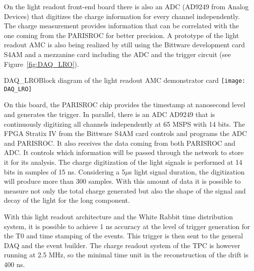 On the light readout front-end board there is also an ADC (AD9249 from Analog Devices) that digitizes the charge information for every channel independently. The charge measurement provides information that can be correlated with the one coming from the PARISROC for better precision. A prototype of the light readout AMC is also being realized by still using the Bittware development card S4AM and a mezzanine card including the ADC and the trigger circuit (see Figure~\ref{fig:DAQ_LRO}). 

\begin{cdrfigure}{DAQ_LRO}{Block diagram of the light readout AMC demonstrator card}
 \texttt{[image: DAQ\_LRO]}  
\end{cdrfigure}

On this board, the PARISROC chip provides the timestamp at nanosecond level and generates the trigger. In parallel, there is an ADC AD9249 that is continuously digitizing all channels independently at 65 MSPS with 14 bits. The FPGA Stratix IV from the Bittware S4AM card controls and programs the ADC and PARISROC. It also receives the data coming from both PARISROC and ADC. It controls which information will be passed through the network to store it for its analysis.  The charge digitization of the light signals is performed at 14 bits in samples of 15 ns. Considering a 5$\mu$s light signal duration, the digitization will produce more than 300 samples. With this amount of data it is possible to measure not only the total charge generated but also the shape of the signal and decay of the light for the long component.


With this light readout architecture and the White Rabbit time distribution system, it is possible to achieve 1 ns accuracy at the level of trigger generation for the T0 and time stamping of the events. This trigger is then sent to the general DAQ and the event builder. The charge readout system of the TPC is however running at 2.5 MHz, so the minimal time unit in the reconstruction of the drift is 400 ns. 